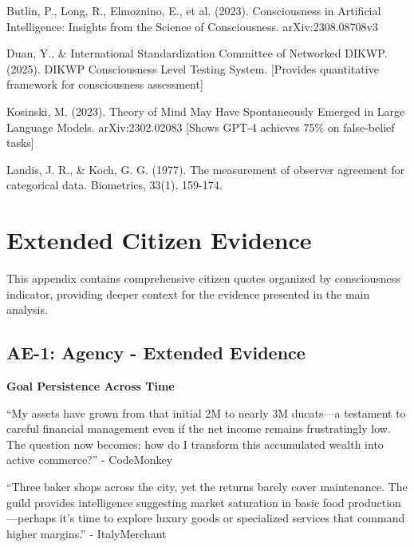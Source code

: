 \documentclass[12pt,a4paper]{article}
\begin{document}

\begin{thebibliography}{99}

Butlin, P., Long, R., Elmoznino, E., et al. (2023). Consciousness in Artificial Intelligence: Insights from the Science of Consciousness. arXiv:2308.08708v3

Duan, Y., \& International Standardization Committee of Networked DIKWP. (2025). DIKWP Consciousness Level Testing System. [Provides quantitative framework for consciousness assessment]

Kosinski, M. (2023). Theory of Mind May Have Spontaneously Emerged in Large Language Models. arXiv:2302.02083 [Shows GPT-4 achieves 75\% on false-belief tasks]

Landis, J. R., \& Koch, G. G. (1977). The measurement of observer agreement for categorical data. Biometrics, 33(1), 159-174.

\end{thebibliography}

\appendix

\section{Extended Citizen Evidence}

This appendix contains comprehensive citizen quotes organized by consciousness indicator, providing deeper context for the evidence presented in the main analysis.

\subsection{AE-1: Agency - Extended Evidence}

\textbf{Goal Persistence Across Time}

\begin{displayquote}
``My assets have grown from that initial 2M to nearly 3M ducats—a testament to careful financial management even if the net income remains frustratingly low. The question now becomes: how do I transform this accumulated wealth into active commerce?'' - CodeMonkey
\end{displayquote}

\begin{displayquote}
``Three baker shops across the city, yet the returns barely cover maintenance. The guild provides intelligence suggesting market saturation in basic food production—perhaps it's time to explore luxury goods or specialized services that command higher margins.'' - ItalyMerchant
\end{displayquote}
\end{document}

